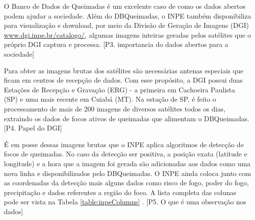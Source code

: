\documentclass[cic,tc]{iiufrgs}
\begin{document}
O Banco de Dados de Queimadas é um excelente caso de como os dados abertos podem ajudar a sociedade. Além do DBQueimadas, o INPE também disponibiliza para visualização e download, por meio da Divisão de Geração de Imagens (DGI) \url{www.dgi.inpe.br/catalogo/}, algumas imagens inteiras geradas pelos satélites que o próprio DGI captura e processa. [P3. importancia do dados abertos para a sociedade] \par

Para obter as imagens brutas dos satélites são necessárias antenas especiais que ficam em centros de recepção de dados. Com esse propósito, a DGI possui duas Estações de Recepção e Gravação (ERG) - a primeira em Cachoeira Paulista (SP) e uma mais recente em Cuiabá (MT). Na estação de SP, é feito o processamento de mais de 200 imagens de diversos satélites todos os dias, extraindo os dados de focos ativos de queimadas que alimentam o DBQueimadas. \citep{SiteDGI} [P4. Papel do DGI] \par

É em posse dessas imagens brutas que o INPE aplica algoritmos de detecção de focos de queimadas. No caso da detecção ser positiva, a posição exata (latitude e longitude) e a hora que a imagem foi gerada são adicionadas aos dados como uma nova linha e disponibilizados pelo DBQueimadas. O INPE ainda coloca junto com as coordenadas da detecção mais alguns dados como risco de fogo, poder do fogo, precipitação e dados referentes a região do foco. A lista completa das colunas pode ser vista na Tabela \ref{table:inpeColumns} \cite{PerguntasFrequentesINPE}. [P5. O que é uma observação nos dados] \par
\end{document}
